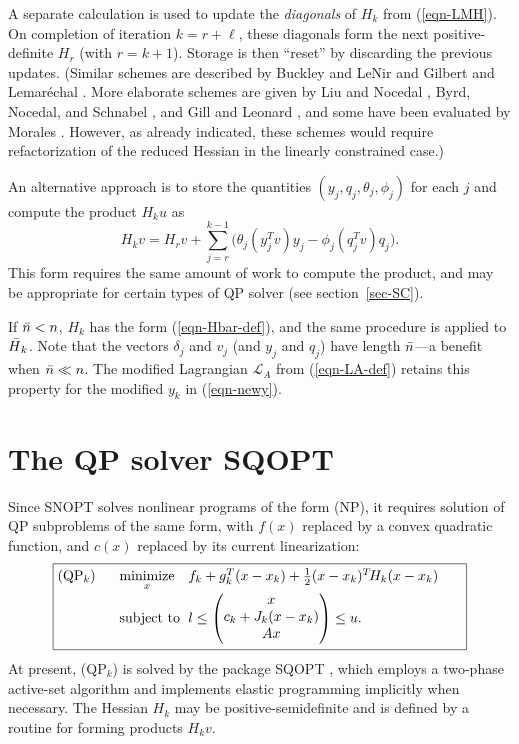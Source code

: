 \documentclass[draft,leqno,onefignum,onetabnum]{siamltex}
\makeatletter
\def\A{_{\scriptscriptstyle A}}
\def\half  {{\textstyle{\frac12}}}
\def\Hbar{\skew5\bar H}
\def\minim{\mathop{\hbox{\rm minimize}}}
\def\minimize#1{{\displaystyle\minim_{#1}}}
\def\nbar{\skew2\bar n}
\def\Lscr{{\mathcal L}}
\def\subject{\mbox{\rm subject to}}
\def\T{^T\!}
\def\strutl{\rule[-1.25ex]{0pt}{3ex}}%
\def\LA{\Lscr\A}                  %
\def\QPk {QP$_k$}
\def\SNOPT {{\small SNOPT}}
\def\SQOPT {{\small SQOPT}}
\def\problem#1#2#3#4{\fbox
   {\begin{tabular*}{0.84\textwidth}
    {@{}l@{\extracolsep{\fill}}l@{\extracolsep{6pt}}l@{\extracolsep{\fill}}c@{}}
      #1 & $\minimize{#2}$ & $#3$ & $ $ \\[5pt]
         & $\subject$      & $#4$ & $ $
    \end{tabular*}}}
\newcommand{\pmat}[1]{\begin{pmatrix}#1\end{pmatrix}}
\makeatother
\begin{document}
A separate calculation is used to update the \emph{diagonals} of $H_k$
from (\ref{eqn-LMH}).  On completion of iteration $k = r + \ell$, these
diagonals form the next positive-definite $H_r$ (with $r =
k+1$).  Storage is then ``reset'' by discarding the previous updates.
(Similar schemes are described by Buckley and LeNir \cite{BL83,BL85}
and Gilbert and Lemar\'echal \cite{GL89}.  More elaborate schemes are
given by Liu and Nocedal \cite{LN89}, Byrd, Nocedal, and Schnabel
\cite{ByrNS94}, and Gill and Leonard \cite{GilL03}, and some have been
evaluated by Morales \cite{Mor02}.  However, as already indicated,
these schemes would require refactorization of the reduced Hessian in
the linearly constrained case.)

An alternative approach is to store the quantities $(y_j, q_j,
\theta_j, \phi_j)$ for each $j$ and compute the product $H_k u$ as
$$
        H_k v = H_r v + \sum_{j=r}^{k-1}
                \big(\theta_j (y_j\T v) y_j - \phi_j (q_j\T v) q_j\big).
$$
This form requires the same amount of work to compute the product, and may
be appropriate for certain types of QP solver (see section~\ref{sec-SC}).

If $\nbar < n$, $H_k$ has the form (\ref{eqn-Hbar-def}),
and the same procedure is applied to $\Hbar_k$.
Note that the vectors $\delta_j$ and $v_j$  (and  $y_j$ and $q_j$)
have length $\nbar$---a benefit when $\nbar \ll n$.
The modified Lagrangian $\LA$ from (\ref{eqn-LA-def})
retains this property for the modified $y_k$ in (\ref{eqn-newy}).







 \section{The QP solver SQOPT} \label{sec-SQOPT}

Since \SNOPT{} solves nonlinear programs of the form (NP),
it requires solution of QP subproblems of the same form,
with $f(x)$ replaced by a convex quadratic function,
and $c(x)$ replaced by its current linearization:
$$
   \problem{(\QPk)}{x}
           {f_k + g_k^T(x-x_k)  +  \half(x-x_k)\T H_k (x-x_k)}
           {l \le \pmat{x \\ c_k + J_k(x-x_k) \\ Ax \strutl} \le u.}
$$
At present, (\QPk) is solved by the package \SQOPT{} \cite{GilMS97b},
which employs a two-phase active-set algorithm and implements
elastic programming implicitly when necessary.  The Hessian $H_k$
may be positive-semidefinite and is defined by a routine for
forming products $H_k v$.
\end{document}
